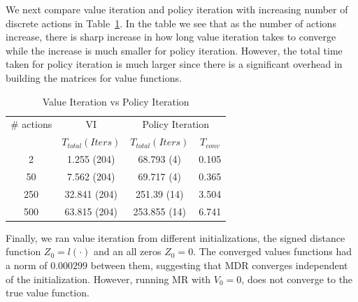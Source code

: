 We next compare value iteration and policy iteration with increasing number of discrete actions in Table~\ref{tab:v_vs_p}. In the table we see that as the number of actions increase, there is sharp increase in how long value iteration takes to converge   while the increase is much smaller for policy iteration. However, the total time taken for policy iteration is much larger since there is a significant overhead in building the matrices for value functions. 
\begin{table}
\centering
\caption{Value Iteration vs Policy Iteration}
\label{tab:v_vs_p}
\begin{tabular}{|c| c| c| c|}
\hline
\# actions & VI & \multicolumn{2}{|c|}{Policy Iteration} \\ \cline{3-4}
 &  $T_{total} (Iters)$ & $T_{total}(Iters)$ & $T_{conv}$ \\ \hline
2 & 1.255 (204) & 68.793 (4) & 0.105 \\ \hline
50 &  7.562 (204)&  69.717 (4)& 0.365 \\ \hline
250 & 32.841 (204)&  251.39 (14)& 3.504 \\ \hline
500 & 63.815 (204)&  253.855 (14)& 6.741 \\
\hline
\end{tabular}
\end{table}

Finally, we ran value iteration from different initializations, the signed distance function $Z_0 = l(\cdot)$ and an all zeros $Z_0= 0$. The converged values functions had a norm of $0.000299$ between them, suggesting that MDR converges independent of the initialization. However, running MR with $V_0 = 0$, does not converge to the true value function.